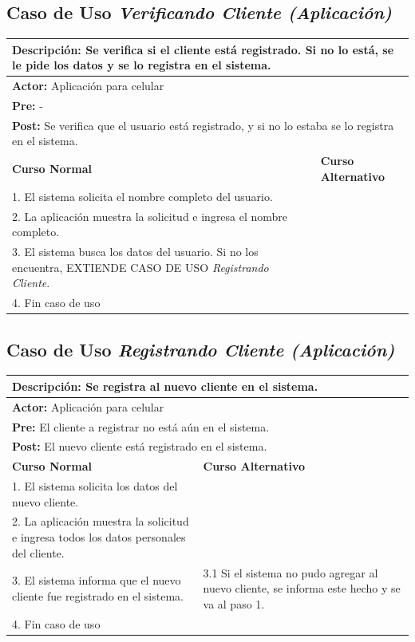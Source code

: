 \documentclass[a4paper]{article}
\begin{document}
\subsection{Caso de Uso \textit{Verificando Cliente (Aplicaci\'on)}}
\begin{center}
\begin{tabular}{|p{10cm} | p{6cm}|}
\hline
\multicolumn{2}{|p{16cm}|}{\textbf{Descripci\'on:} Se verifica si el cliente est\'a registrado. Si no lo est\'a, se le pide los datos y se lo registra en el sistema.} \\
\hline
\multicolumn{2}{|l|}{\textbf{Actor:} Aplicaci\'on para celular} \\
\hline
\multicolumn{2}{|l|}{\textbf{Pre:} -} \\
\hline
\multicolumn{2}{|p{14cm}|}{\textbf{Post:} Se verifica que el usuario est\'a registrado, y si no lo estaba se lo registra en el sistema.}\\
\hline
\textbf{Curso Normal}  & \textbf{Curso Alternativo} \\ \hline
1. El sistema solicita el nombre completo del usuario. & \\ \hline
2. La aplicaci\'on muestra la solicitud e ingresa el nombre completo. & \\ \hline
3. El sistema busca los datos del usuario. Si no los encuentra, EXTIENDE CASO DE USO \textit{Registrando Cliente}. & \\ \hline
4. Fin caso de uso & \\ \hline
\end{tabular}
\end{center}

\subsection{Caso de Uso \textit{Registrando Cliente (Aplicaci\'on)}}
\begin{center}
\begin{tabular}{|p{10cm} | p{6cm}|}
\hline
\multicolumn{2}{|p{16cm}|}{\textbf{Descripci\'on:} Se registra al nuevo cliente en el sistema.} \\
\hline
\multicolumn{2}{|l|}{\textbf{Actor:} Aplicaci\'on para celular} \\
\hline
\multicolumn{2}{|l|}{\textbf{Pre:} El cliente a registrar no est\'a a\'un en el sistema.} \\
\hline
\multicolumn{2}{|p{14cm}|}{\textbf{Post:} El nuevo cliente est\'a registrado en el sistema.}\\
\hline
\textbf{Curso Normal}  & \textbf{Curso Alternativo} \\ \hline
1. El sistema solicita los datos del nuevo cliente. & \\ \hline
2. La aplicaci\'on muestra la solicitud e ingresa todos los datos personales del cliente. & \\ \hline
3. El sistema informa que el nuevo cliente fue registrado en el sistema. & 3.1 Si el sistema no pudo agregar al nuevo cliente, se informa este hecho y se va al paso 1. \\ \hline
4. Fin caso de uso & \\ \hline
\end{tabular}
\end{center}
\end{document}
